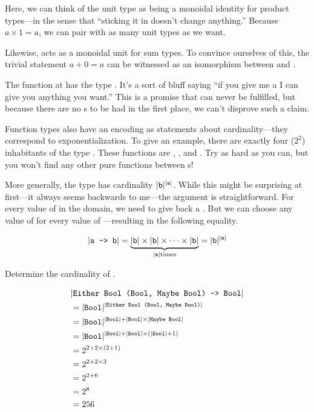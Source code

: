 \documentclass[book.tex]{subfiles}
\begin{document}

Here, we can think of the unit type as being a monoidal identity for product
types---in the sense that ``sticking it in doesn't change anything.'' Because $a
\times 1 = a$, we can pair with as many unit types as we want.

Likewise,  acts as a monoidal unit for sum types. To convince ourselves
of this, the trivial statement $a+0 = a$ can be witnessed as an isomorphism
between  and .


The function  at  has the type . It's a sort of
bluff saying ``if you give me a  I can give you anything you want.''
This is a promise that can never be fulfilled, but because there are no
s to be had in the first place, we can't disprove such a claim.

Function types also have an encoding as statements about cardinality---they
correspond to exponentialization. To give an example, there are exactly four
($2^2$) inhabitants of the type . These functions are ,
,  and . Try as hard as you can, but you
won't find any other pure functions between s!

More generally, the type  has cardinality $\lvert\texttt{b}\rvert^{\lvert\texttt{a}\rvert}$.
While this might be surprising at first---it always seems backwards to me---the
argument is straightforward. For every value of  in the domain, we need to
give back a . But we can choose any value of  for every value of
---resulting in the following equality.

$$
\lvert\texttt{a -> b}\rvert = \underbrace{\lvert\texttt{b}\rvert \times \lvert\texttt{b}\rvert \times \cdots \times
\lvert\texttt{b}\rvert}_{\lvert\texttt{a}\rvert \text{times}} = \lvert\texttt{b}\rvert^{\lvert\texttt{a}\rvert}
$$

\begin{exercise}
Determine the cardinality of .
\end{exercise}
\begin{solution}
\begin{align*}
  &  \lvert\texttt{Either Bool (Bool, Maybe Bool) -> Bool}\rvert \\
  &= \lvert\texttt{Bool}\rvert^{\lvert\texttt{Either Bool (Bool, Maybe Bool)}\rvert} \\
  &= \lvert\texttt{Bool}\rvert^{\lvert\texttt{Bool}\rvert+\lvert\texttt{Bool}\rvert\times\lvert\texttt{Maybe Bool}\rvert} \\
  &= \lvert\texttt{Bool}\rvert^{\lvert\texttt{Bool}\rvert+\lvert\texttt{Bool}\rvert\times(\lvert\texttt{Bool}\rvert+1)} \\
  &= 2^{2+2\times(2+1)} \\
  &= 2^{2+2\times 3} \\
  &= 2^{2+6} \\
  &= 2^{8} \\
  &= 256
\end{align*}
\end{solution}
\end{document}
